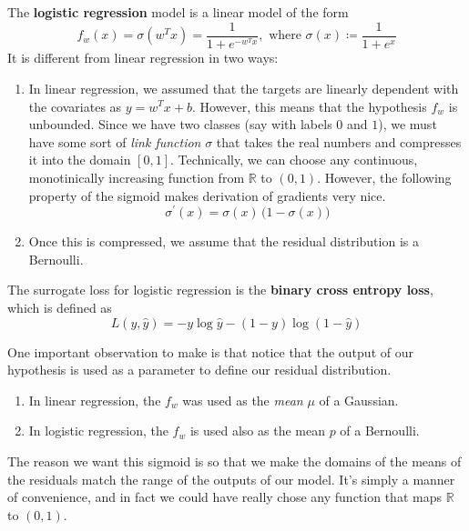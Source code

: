 \documentclass{article}
\begin{document}
  \begin{definition}
    The \textbf{logistic regression} model is a linear model of the form 
    \begin{equation}
      f_w (x) = \sigma (w^T x) = \frac{1}{1 + e^{- w^T x}}, \text{ where } \sigma(x) \coloneqq \frac{1}{1 + e^{x}}
    \end{equation}
    It is different from linear regression in two ways: 
    \begin{enumerate}
      \item In linear regression, we assumed that the targets are linearly dependent with the covariates as $y = w^T x + b$. However, this means that the hypothesis $f_w$ is unbounded. Since we have two classes (say with labels $0$ and $1$), we must have some sort of \textit{link function} $\sigma$ that takes the real numbers and compresses it into the domain $[0, 1]$. Technically, we can choose any continuous, monotinically increasing function from $\mathbb{R}$ to $(0, 1)$. However, the following property of the sigmoid makes derivation of gradients very nice. 
        \begin{equation}
          \sigma^\prime (x) = \sigma(x) \, \big(1 - \sigma(x) \big)
        \end{equation}
      \item Once this is compressed, we assume that the residual distribution is a Bernoulli. 
    \end{enumerate}
  \end{definition}

  \begin{definition}
    The surrogate loss for logistic regression is the \textbf{binary cross entropy loss}, which is defined as
    \begin{equation}
      L(y, \hat{y}) = -y \log \hat{y} - (1 - y) \log (1 - \hat{y})
    \end{equation}
  \end{definition}

  One important observation to make is that notice that the output of our hypothesis is used as a parameter to define our residual distribution. 
  \begin{enumerate}
    \item In linear regression, the $f_w$ was used as the \textit{mean} $\mu$ of a Gaussian. 
    \item In logistic regression, the $f_w$ is used also as the mean $p$ of a Bernoulli. 
  \end{enumerate}
  The reason we want this sigmoid is so that we make the domains of the means of the residuals match the range of the outputs of our model. It's simply a manner of convenience, and in fact we could have really chose any function that maps $\mathbb{R}$ to $(0, 1)$. 
\end{document}
